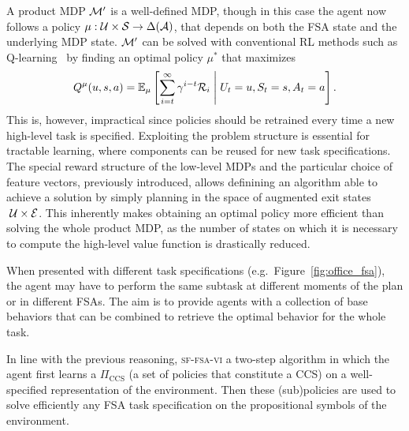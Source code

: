 A product MDP $\mathcal{M}'$ is a well-defined MDP, though in this case the agent now follows a policy $\mu:\mathcal{U}\times\mathcal{S}\rightarrow\Delta(\mathcal{A})$, that depends on both the FSA state and the underlying MDP state. $\mathcal{M}'$ can be solved with conventional RL methods such as Q-learning~\citep{Watkins1992} by finding an optimal policy $\mu^*$ that maximizes
\begin{equation*}
Q^\mu(u, s, a) = \mathbb{E}_{\mu}\left[\sum_{i=t}^\infty \gamma^{i-t}\mathcal{R}_i\;\middle\lvert\;U_t= u, S_t=s, A_t=a\right].
\end{equation*}
This is, however, impractical since policies should be retrained every time a new high-level task is specified. Exploiting the problem structure is essential for tractable learning, where components can be reused for new task specifications. The special reward structure of the low-level MDPs and the particular choice of feature vectors, previously introduced, allows definining an algorithm able to achieve a solution by simply planning in the space of augmented exit states $\;\mathcal{U}\times\mathcal{E}$. This inherently makes obtaining an optimal policy more efficient than solving the whole product MDP, as the number of states on which it is necessary to compute the high-level value function is drastically reduced.

When presented with different task specifications (e.g.~Figure~\ref{fig:office_fsa}), the agent may have to perform the same subtask at different moments of the plan or in different FSAs. The aim is to provide agents with a collection of base behaviors that can be combined to retrieve the optimal behavior for the whole task.

In line with the previous reasoning, \textsc{sf-fsa-vi} a two-step algorithm in which the agent first learns a $\Pi_{\text{CCS}}$ (a set of policies that constitute a CCS) on a well-specified representation of the environment. Then these (sub)policies are used to solve efficiently any FSA task specification on the propositional symbols of the environment. 

